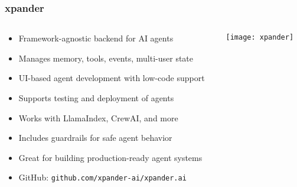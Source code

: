 \begin{frame}[fragile]\frametitle{xpander}
\begin{columns}
    \begin{column}[T]{0.6\linewidth}
      \begin{itemize}
        \item Framework-agnostic backend for AI agents
        \item Manages memory, tools, events, multi-user state
        \item UI-based agent development with low-code support
        \item Supports testing and deployment of agents
        \item Works with LlamaIndex, CrewAI, and more
        \item Includes guardrails for safe agent behavior
        \item Great for building production-ready agent systems
        \item GitHub: \texttt{github.com/xpander-ai/xpander.ai}
      \end{itemize}
    \end{column}
    \begin{column}[T]{0.4\linewidth}
        \begin{center}
        \texttt{[image: xpander]}
        \end{center}	
    \end{column}
\end{columns}
\end{frame}

